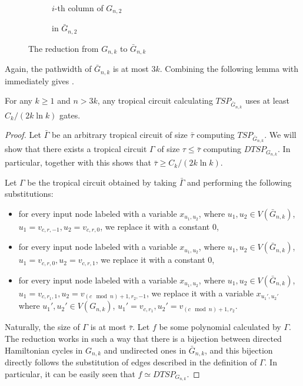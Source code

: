 \begin{figure}[h]
    \centering
    \label{fig:reduction}
    \begin{subfigure}{0.45\textwidth}
        \centering        
        \caption{$i$-th column of $G_{n,2}$}
    \end{subfigure}
    \hfill
    \begin{subfigure}{0.45\textwidth}
        \centering        
        \caption{in $\bar{G}_{n,2}$}
    \end{subfigure}
    \caption{The reduction from $G_{n,k}$ to $\bar{G}_{n,k}$}
\end{figure}


Again, the pathwidth of $\bar{G}_{n, k}$ is at most $3k$.
Combining the following lemma with  immediately gives .

\begin{lemma}\label{lem:tc_tsp}
    For any $k \geq 1$ and $n > 3k$, any tropical circuit calculating $TSP_{\bar{G}_{n, k}}$ uses at least
    $C_k / (2k \ln k)$
    gates.
\end{lemma}

\begin{proof}
    Let $\bar\Gamma$ be an arbitrary tropical circuit of size $\bar\tau$ computing $TSP_{\bar{G}_{n, k}}$. We will show that there exists a tropical circuit $\Gamma$ of size $\tau \leq \bar\tau$ computing $DTSP_{G_{n, k}}$. In particular, together with  this shows that $\bar\tau \geq C_k/(2k \ln k)$.

    Let $\Gamma$ be the tropical circuit obtained by taking $\bar\Gamma$ and performing the following substitutions:
    \begin{itemize}
        \item for every input node labeled with a variable $x_{u_1, u_2}$, where $u_1, u_2 \in V(\bar{G}_{n, k})$, $u_1 = v_{c, r, -1}, u_2 = v_{c, r, 0}$, we replace it with a constant $0$,
        \item for every input node labeled with a variable $x_{u_1, u_2}$, where $u_1, u_2 \in V(\bar{G}_{n, k})$, $u_1 = v_{c, r, 0}, u_2 = v_{c, r, 1}$, we replace it with a constant $0$,
        \item for every input node labeled with a variable $x_{u_1, u_2}$, where $u_1, u_2 \in V(\bar{G}_{n, k})$, $u_1 = v_{c, r_1, 1}, u_2 = v_{(c \mod n) + 1, r_2, -1}$, we replace it with a variable $x_{u_1', u_2'}$ where $u_1', u_2' \in V(G_{n, k})$, $u_1' = v_{c, r_1}, u_2' = v_{(c \mod n) + 1, r_2}$.
    \end{itemize}
    Naturally, the size of $\Gamma$ is at most $\bar\tau$. Let $f$ be some polynomial calculated by $\Gamma$. The reduction works in such a way that there is a bijection between directed Hamiltonian cycles in $G_{n, k}$ and undirected ones in $\bar{G}_{n, k}$, and this bijection directly follows the substitution of edges described in the definition of $\Gamma$. In particular, it can be easily seen that $f \simeq DTSP_{G_{n,k}}$.

\end{proof}